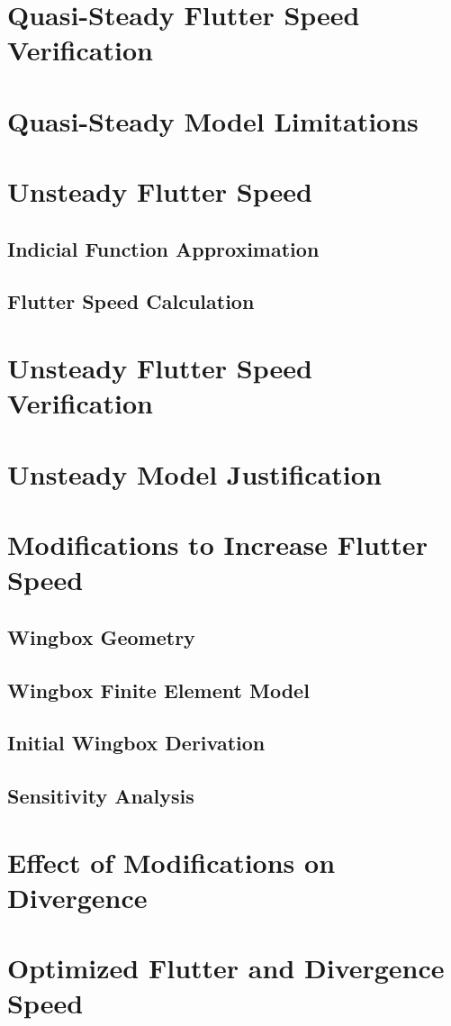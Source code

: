 \section{Quasi-Steady Flutter Speed Verification}

\section{Quasi-Steady Model Limitations}

\section{Unsteady Flutter Speed}

\subsection{Indicial Function Approximation}

\subsection{Flutter Speed Calculation}

\section{Unsteady Flutter Speed Verification}

\section{Unsteady Model Justification}

\section{Modifications to Increase Flutter Speed}

\subsection{Wingbox Geometry}

\subsection{Wingbox Finite Element Model}

\subsection{Initial Wingbox Derivation}

\subsection{Sensitivity Analysis}

\section{Effect of Modifications on Divergence}

\section{Optimized Flutter and Divergence Speed}
